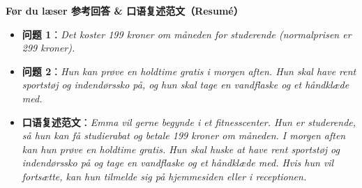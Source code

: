 \begin{answerbox}
\textbf{Før du læser 参考回答 \& 口语复述范文（Resumé）}
\begin{itemize}
  \item \textbf{问题 1}：\textit{Det koster 199 kroner om måneden for studerende (normalprisen er 299 kroner).}
  \item \textbf{问题 2}：\textit{Hun kan prøve en holdtime gratis i morgen aften. Hun skal have rent sportstøj og indendørssko på, og hun skal tage en vandflaske og et håndklæde med.}
  \item \textbf{口语复述范文}：\textit{Emma vil gerne begynde i et fitnesscenter. Hun er studerende, så hun kan få studierabat og betale 199 kroner om måneden. I morgen aften kan hun prøve en holdtime gratis. Hun skal huske at have rent sportstøj og indendørssko på og tage en vandflaske og et håndklæde med. Hvis hun vil fortsætte, kan hun tilmelde sig på hjemmesiden eller i receptionen.}
\end{itemize}
\end{answerbox}
